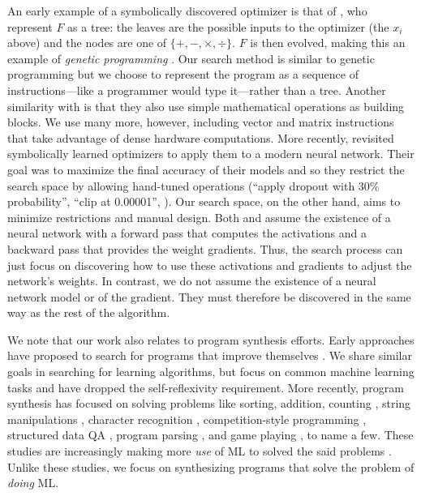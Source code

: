 {An early example of a symbolically discovered optimizer is that of , who represent $F$ as a tree: the leaves are the possible inputs to the optimizer (\ie the $x_i$ above) and the nodes are one of $\{+, -, \times, \div\}$. $F$ is then evolved, making this an example of \textit{genetic programming} \cite{holland1975adaptation,forsyth1981beagle,koza1992genetic}. Our search method is similar to genetic programming but we choose to represent the program as a sequence of instructions---like a programmer would type it---rather than a tree. Another similarity with  is that they also use simple mathematical operations as building blocks. We use many more, however, including vector and matrix instructions that take advantage of dense hardware computations. More recently,  revisited symbolically learned optimizers to apply them to a modern neural network. Their goal was to maximize the final accuracy of their models and so they restrict the search space by allowing hand-tuned operations (\eg ``apply dropout with 30\% probability'', ``clip at 0.00001'', \etc). Our
search space, on the other hand, aims to minimize restrictions and manual design. Both  and  assume the existence of a neural network with a forward pass that computes the activations and a backward pass that provides the weight gradients. Thus, the search process can just focus on discovering how to use these activations and gradients to adjust the network's weights. In contrast, we do not assume the existence of a neural network model or of the gradient. They must therefore be discovered in the same way as the rest of the algorithm.

We note that our work also relates to program synthesis efforts. Early approaches have proposed to search for programs that improve themselves \cite{lenat1983eurisko,schmidhuber1987evolutionary,pitrat1996implementation}. We share similar goals in searching for learning algorithms, but focus on common machine learning tasks and have dropped the self-reflexivity requirement. More recently, program synthesis has focused on solving problems like sorting, addition, counting \cite{schmidhuber2004optimal,graves2014neural,Reed2015NeuralP,Valkov2018HOUDINILL}, string manipulations \cite{Polozov2015FlashMetaAF,Parisotto2016NeuroSymbolicPS,Devlin2017RobustFillNP}, character recognition \cite{lake2015human}, competition-style programming \cite{balog2017deepcoder}, structured data QA \cite{Neelakantan2015NeuralPI,Liang2016NeuralSM,Liang2018MemoryAP}, program parsing \cite{chen2017towards}, and game playing \cite{wilson2018evolving}, to name a few. These studies are increasingly making more \textit{use} of ML to solved the said problems \cite{gulwani2017program}. Unlike these studies, we focus on synthesizing programs that solve the problem of \textit{doing} ML.
}

